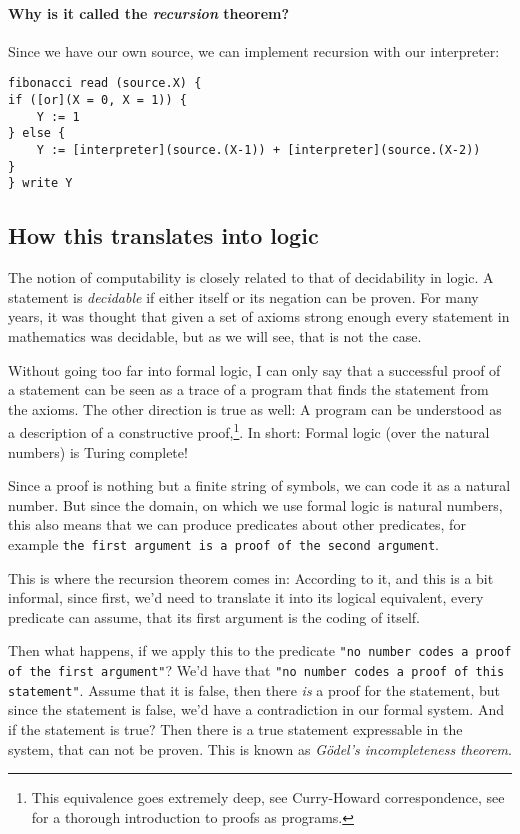 \paragraph{Why is it called the {\em recursion} theorem?}
Since we have our own source, we can implement recursion with our interpreter:
\begin{verbatim}
fibonacci read (source.X) {
if ([or](X = 0, X = 1)) {
	Y := 1
} else {
	Y := [interpreter](source.(X-1)) + [interpreter](source.(X-2))
}
} write Y
\end{verbatim}

\subsection{How this translates into logic}
The notion of computability is closely related to that of decidability in 
logic. A statement is {\em decidable}\/ if either itself or its negation can be 
proven. For many years, it was thought that given a set of axioms strong 
enough every statement in mathematics was decidable, but as we will 
see, that is not the case.

Without going too far into formal logic, I can only say that a successful proof
of a statement can be seen as a trace of a program that finds the statement
from the axioms. The other direction is true as well: A program can be
understood as a description of a constructive proof,\footnote{This equivalence
goes extremely deep, see Curry-Howard correspondence, see
\cite{girard1989proofs} for a thorough introduction to proofs as programs.}.
In short: Formal logic (over the natural numbers) is Turing complete!

Since a proof is nothing but a finite string of symbols, we can code it as a
natural number. But since the domain, on which we use formal logic is natural
numbers, this also means that we can produce predicates about other predicates,
for example {\tt the first argument is a proof of the second argument}.

This is where the recursion theorem comes in: According to it, and this is a 
bit informal, since first, we'd need to translate it into its logical 
equivalent, every predicate can assume, that its first argument is the coding 
of itself.

Then what happens, if we apply this to the predicate {\tt "no number codes a proof 
of the first argument"}? We'd have that {\tt "no number codes a proof of this
statement"}. Assume that it is false, then there {\em is}\/ a proof for the 
statement, but since the statement is false, we'd have a contradiction in our 
formal system. And if the statement is true? Then there is a true statement 
expressable in the system, that can not be proven. This is known as {\em Gödel's 
incompleteness theorem}. 

